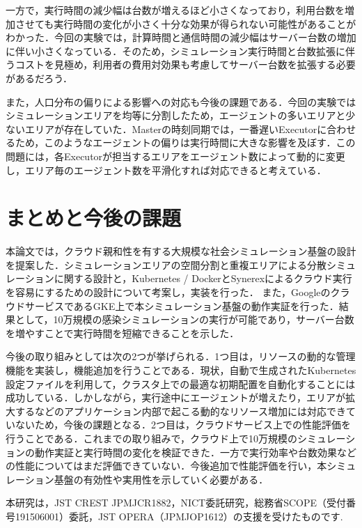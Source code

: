 \documentclass[originalpaper]{jsaiart}     %
\begin{document}
一方で，実行時間の減少幅は台数が増えるほど小さくなっており，利用台数を増加させても実行時間の変化が小さく十分な効果が得られない可能性があることがわかった．今回の実験では，計算時間と通信時間の減少幅はサーバー台数の増加に伴い小さくなっている．そのため，シミュレーション実行時間と台数拡張に伴うコストを見極め，利用者の費用対効果も考慮してサーバー台数を拡張する必要があるだろう．

また，人口分布の偏りによる影響への対応も今後の課題である．今回の実験ではシミュレーションエリアを均等に分割したため，エージェントの多いエリアと少ないエリアが存在していた．Masterの時刻同期では，一番遅いExecutorに合わせるため，このようなエージェントの偏りは実行時間に大きな影響を及ぼす．この問題には，各Executorが担当するエリアをエージェント数によって動的に変更し，エリア毎のエージェント数を平滑化すれば対応できると考えている．

\section{まとめと今後の課題}%
本論文では，クラウド親和性を有する大規模な社会シミュレーション基盤の設計を提案した．シミュレーションエリアの空間分割と重複エリアによる分散シミュレーションに関する設計と，Kubernetes / DockerとSynerexによるクラウド実行を容易にするための設計について考案し，実装を行った．
また，GoogleのクラウドサービスであるGKE上で本シミュレーション基盤の動作実証を行った．結果として，10万規模の感染シミュレーションの実行が可能であり，サーバー台数を増やすことで実行時間を短縮できることを示した．

今後の取り組みとしては次の2つが挙げられる．1つ目は，リソースの動的な管理機能を実装し，機能追加を行うことである．現状，自動で生成されたKubernetes設定ファイルを利用して，クラスタ上での最適な初期配置を自動化することには成功している．しかしながら，実行途中にエージェントが増えたり，エリアが拡大するなどのアプリケーション内部で起こる動的なリソース増加には対応できていないため，今後の課題となる．2つ目は，クラウドサービス上での性能評価を行うことである．これまでの取り組みで，クラウド上で10万規模のシミュレーションの動作実証と実行時間の変化を検証できた．一方で実行効率や台数効果などの性能についてはまだ評価できていない．今後追加で性能評価を行い，本シミュレーション基盤の有効性や実用性を示していく必要がある．

\begin{acknowledgment}
    本研究は，JST CREST JPMJCR1882，NICT委託研究，総務省SCOPE（受付番号191506001）委託，JST OPERA（JPMJOP1612）の支援を受けたものです.
\end{acknowledgment}
\end{document}
